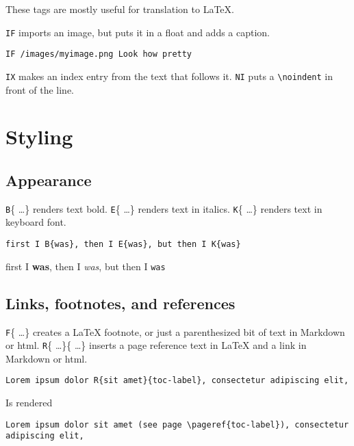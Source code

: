 These tags are mostly useful for translation to \LaTeX{}.


\texttt{IF} imports an image, but puts it in a float and adds a caption.

\begin{verbatim}
IF /images/myimage.png Look how pretty
\end{verbatim}

\texttt{IX} makes an index entry from the text that follows it. \texttt{NI} puts a \texttt{\textbackslash noindent} in front of the line.

\chapter{Styling}
\label{styling}
\section{Appearance}
\label{appearance}

\texttt{B}\{ \ldots  \} renders text bold. \texttt{E}\{ \ldots  \} renders text in italics. \texttt{K}\{ \ldots  \} renders text in keyboard font.

\begin{verbatim}
first I B{was}, then I E{was}, but then I K{was}
\end{verbatim}

first I \textbf{was}, then I \emph{was}, but then I \texttt{was}

\section{Links, footnotes, and references}
\label{links,-footnotes,-and-references}

\texttt{F}\{ \ldots  \} creates a \LaTeX{} footnote, or just a parenthesized bit of text in Markdown or html. \texttt{R}\{ \ldots  \}\{ \ldots  \} inserts a page reference text in \LaTeX{} and a link in Markdown or html.

\begin{verbatim}
Lorem ipsum dolor R{sit amet}{toc-label}, consectetur adipiscing elit,
\end{verbatim}

Is rendered

\begin{verbatim}
Lorem ipsum dolor sit amet (see page \pageref{toc-label}), consectetur adipiscing elit,
\end{verbatim}

